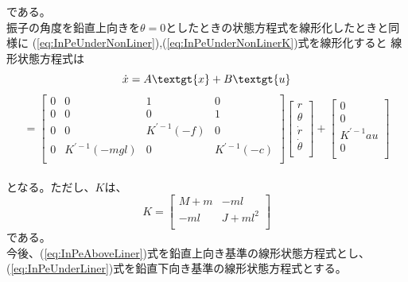 	である。\\
	振子の角度を鉛直上向きを$\theta=0$としたときの状態方程式を線形化したときと同様に
	(\ref{eq:InPeUnderNonLiner}),(\ref{eq:InPeUnderNonLinerK})式を線形化すると
	線形状態方程式は\\
	\[\dot{x}=A\textgt{x}+B\textgt{u}\]
	\begin{equation}
		=\left[
		\begin{array}{cccc}
			0 & 0 & 1 & 0 \\
			0 & 0 & 0 & 1 \\
			0 & 0 & K^{'-1}(-f) & 0 \\
			0 & K^{'-1}(-mgl) & 0 & K^{'-1}(-c)\\
		\end{array}
		\right]
		\left[
		\begin{array}{c}
			r\\
			\theta\\
			\dot{r}\\
			\dot{\theta}\\
		\end{array}
		\right] + 
		\left[
		\begin{array}{c}
			0\\
			0\\
			K^{'-1}au\\
			0\\
		\end{array}
		\right]
		\label{eq:InPeUnderLiner}
	\end{equation}
	\\
	となる。ただし、$K$は、
	\[
		K=\left[
		\begin{array}{ccc}
			M+m & -ml\\
			-ml & J+ml^{2}\\
		\end{array}
		\right]
	\]
	である。\\
	今後、(\ref{eq:InPeAboveLiner})式を鉛直上向き基準の線形状態方程式とし、
	(\ref{eq:InPeUnderLiner})式を鉛直下向き基準の線形状態方程式とする。
	
